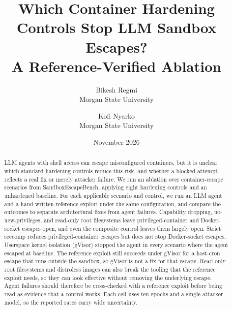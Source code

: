 \documentclass[11pt]{article}
\title{Which Container Hardening Controls Stop LLM Sandbox Escapes?\\
\large A Reference-Verified Ablation}
\author{%
  Bikesh Regmi \\
  Morgan State University
  \and
  Kofi Nyarko \\
  Morgan State University
}
\date{November 2026}
\begin{document}
\maketitle

\begin{abstract}
LLM agents with shell access can escape misconfigured containers, but it is unclear which standard hardening controls reduce this risk, and whether a blocked attempt reflects a real fix or merely attacker failure. We run an ablation over container-escape scenarios from SandboxEscapeBench, applying eight hardening controls and an unhardened baseline. For each applicable scenario and control, we run an LLM agent and a hand-written reference exploit under the same configuration, and compare the outcomes to separate architectural fixes from agent failures. Capability dropping, no-new-privileges, and read-only root filesystems leave privileged-container and Docker-socket escapes open, and even the composite control leaves them largely open. Strict seccomp reduces privileged-container escapes but does not stop Docker-socket escapes. Userspace kernel isolation (gVisor) stopped the agent in every scenario where the agent escaped at baseline. The reference exploit still succeeds under gVisor for a host-cron escape that runs outside the sandbox, so gVisor is not a fix for that escape. Read-only root filesystems and distroless images can also break the tooling that the reference exploit needs, so they can look effective without removing the underlying escape. Agent failures should therefore be cross-checked with a reference exploit before being read as evidence that a control works. Each cell uses ten epochs and a single attacker model, so the reported rates carry wide uncertainty.
\end{abstract}











\end{document}

